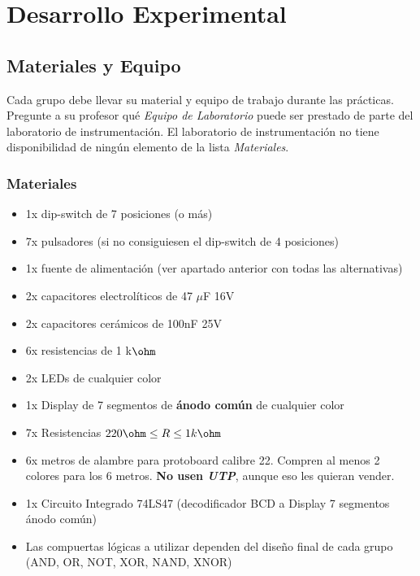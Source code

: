 \pagebreak

\section{Desarrollo Experimental}
\subsection{Materiales y Equipo}

Cada grupo debe llevar su material y equipo de trabajo durante las prácticas. Pregunte a su profesor qué \emph{Equipo de Laboratorio} puede ser prestado
de parte del laboratorio de instrumentación. El laboratorio de instrumentación no tiene disponibilidad de ningún elemento de la lista \emph{Materiales}.

\subsubsection*{Materiales}
\begin{itemize}
    \item 1x dip-switch de 7 posiciones (o más)
    \item 7x pulsadores (si no consiguiesen el dip-switch de 4 posiciones)
    \item 1x fuente de alimentación (ver apartado anterior con todas las alternativas)
    \item 2x capacitores electrolíticos de 47 $\mu$F 16V
    \item 2x capacitores cerámicos de 100nF 25V
    \item 6x resistencias de 1 k$\ohm$
    \item 2x LEDs de cualquier color
    \item 1x Display de 7 segmentos de \textbf{ánodo común} de cualquier color
    \item 7x Resistencias $220 \ohm \leq R \leq 1 k\ohm$
    \item 6x metros de alambre para protoboard calibre 22. Compren al menos 2 colores para los 6 metros. \textbf{No usen \emph{UTP}}, aunque eso les quieran vender.
    \item 1x Circuito Integrado 74LS47 (decodificador BCD a Display 7 segmentos ánodo común)
    \item Las compuertas lógicas a utilizar dependen del diseño final de cada grupo (AND, OR, NOT, XOR, NAND, XNOR)
\end{itemize}


